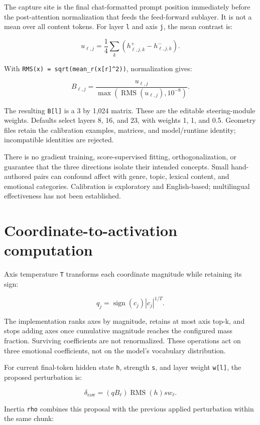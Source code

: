 \documentclass[manuscript,screen,nonacm]{acmart}
\begin{document}
The capture site is the final chat-formatted prompt position immediately
before the post-attention normalization that feeds the feed-forward
sublayer. It is not a mean over all content tokens. For layer \nolinkurl{l}
and axis \nolinkurl{j}, the mean contrast is:

\[u_{\ell,j}=\frac14\sum_k(h^+_{\ell,j,k}-h^-_{\ell,j,k}).\]

With \texttt{RMS(x)\ =\ sqrt(mean\_r(x{[}r{]}\^{}2))}, normalization
gives:

\[B_{\ell,j}=\frac{u_{\ell,j}}{\max(\operatorname{RMS}(u_{\ell,j}),10^{-8})}.\]

The resulting \texttt{B{[}l{]}} is a 3 by 1,024 matrix. These are the
editable steering-module weights. Defaults select layers 8, 16, and 23,
with weights 1, 1, and 0.5. Geometry files retain the calibration
examples, matrices, and model/runtime identity; incompatible identities
are rejected.

There is no gradient training, score-supervised fitting,
orthogonalization, or guarantee that the three directions isolate their
intended concepts. Small hand-authored pairs can confound affect with
genre, topic, lexical content, and emotional categories. Calibration is
exploratory and English-based; multilingual effectiveness has not been
established.

\section{Coordinate-to-activation
computation}\label{coordinate-to-activation-computation}

Axis temperature \nolinkurl{T} transforms each coordinate magnitude while
retaining its sign:

\[q_j=\operatorname{sign}(c_j)|c_j|^{1/T}.\]

The implementation ranks axes by magnitude, retains at most axis top-k,
and stops adding axes once cumulative magnitude reaches the configured
mass fraction. Surviving coefficients are not renormalized. These
operations act on three emotional coefficients, not on the model's
vocabulary distribution.

For current final-token hidden state \nolinkurl{h}, strength \nolinkurl{s},
and layer weight \texttt{w{[}l{]}}, the proposed perturbation is:

\[\delta_{\mathrm{raw}}=(q B_\ell)\operatorname{RMS}(h)s w_\ell.\]

Inertia \nolinkurl{rho} combines this proposal with the previous applied
perturbation within the same chunk:
\end{document}
